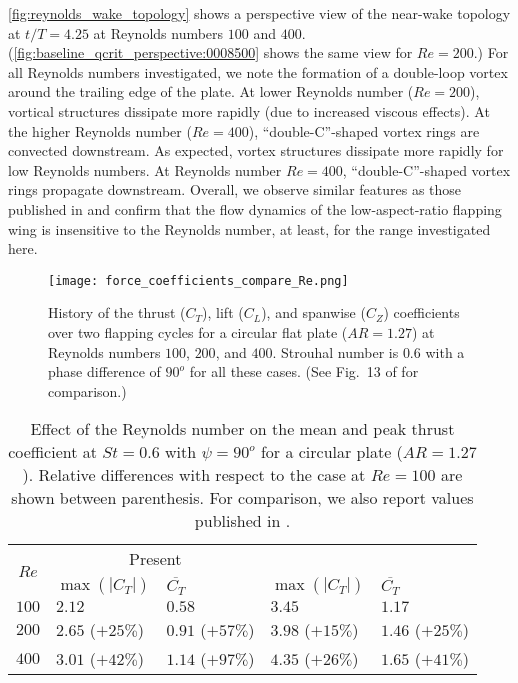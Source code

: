 \cref{fig:reynolds_wake_topology} shows a perspective view of the near-wake topology at $t/T = 4.25$ at Reynolds numbers $100$ and $400$.
(\cref{fig:baseline_qcrit_perspective:0008500} shows the same view for $Re = 200$.)
For all Reynolds numbers investigated, we note the formation of a double-loop vortex around the trailing edge of the plate.
At lower Reynolds number ($Re = 200$), vortical structures dissipate more rapidly (due to increased viscous effects).
At the higher  Reynolds number ($Re = 400$), ``double-C''-shaped vortex rings are convected downstream.
As expected, vortex structures dissipate more rapidly for low Reynolds numbers.
At Reynolds number $Re = 400$, ``double-C''-shaped vortex rings propagate downstream.
Overall, we observe similar features as those published in \citet{li_dong_2016} and confirm that the flow dynamics of the low-aspect-ratio flapping wing is insensitive to the Reynolds number, at least, for the range investigated here.

\begin{figure}[!h]
  \centering
  \texttt{[image: force\_coefficients\_compare\_Re.png]}
  \caption{History of the thrust ($C_T$), lift ($C_L$), and spanwise ($C_Z$) coefficients over two flapping cycles for a circular flat plate ($AR = 1.27$) at Reynolds numbers $100$, $200$, and $400$. Strouhal number is $0.6$ with a phase difference of $90^o$ for all these cases. (See Fig.~13 of \citet{li_dong_2016} for comparison.)}
  \label{fig:reynolds_force_coefficients}
\end{figure}

\begin{table}[!h]
  \centering
  \begin{tabular}{cllll}
    \hline\hline
    \multirow{2}{*}{$Re$} &
      \multicolumn{2}{c}{Present} &
      \multicolumn{2}{c}{\citet{li_dong_2016}} \\
    & $\max \left( |C_T| \right)$ & $\overline{C_T}$ & $\max \left( |C_T| \right)$ & $\overline{C_T}$ \\
    \hline
    $100$ & $2.12$ & $0.58$ & $3.45$ & $1.17$ \\
    $200$ & $2.65$ ($+25\%$) & $0.91$ ($+57\%$) & $3.98$ ($+15\%$) & $1.46$ ($+25\%$) \\
    $400$ & $3.01$ ($+42\%$) & $1.14$ ($+97\%$) & $4.35$ ($+26\%$) & $1.65$ ($+41\%$) \\
    \hline\hline
  \end{tabular}
  \caption{Effect of the Reynolds number on the mean and peak thrust coefficient at $St = 0.6$ with $\psi = 90^o$ for a circular plate ($AR = 1.27$). Relative differences with respect to the case at $Re = 100$ are shown between parenthesis. For comparison, we also report values published in \citet{li_dong_2016}.}
  \label{tab:reynolds_thrust_stats}
\end{table}

